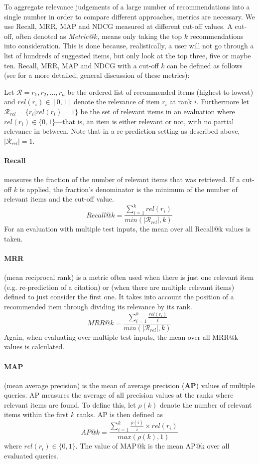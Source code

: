 To aggregate relevance judgements of a large number of recommendations into a single number in order to compare different approaches, metrics are necessary. We use Recall, MRR, MAP and NDCG measured at different cut-off values. A cut-off, often denoted as \emph{Metric@}$k$, means only taking the top $k$ recommendations into consideration. This is done because, realistically, a user will not go through a list of hundreds of suggested items, but only look at the top three, five or maybe ten. Recall, MRR, MAP and NDCG with a cut-off $k$ can be defined as follows (see \cite{Aggarwal2016} for a more detailed, general discussion of these metrics):

Let $\mathcal{R} = r_1,r_2, ..., r_n$ be the ordered list of recommended items (highest to lowest) and ${\mathit{rel}(r_i)\in[0, 1]}$ denote the relevance of item $r_i$ at rank $i$. Furthermore let ${\mathcal{R}_{rel}=\{r_i|\mathit{rel}(r_i)=1\}}$ be the set of relevant items in an evaluation where $\mathit{rel}(r_i)\in\{0,1\}$---that is, an item is either relevant or not, with no partial relevance in between. Note that in a re-prediction setting as described above, $|\mathcal{R}_{rel}|=1$.

\paragraph{Recall} measures the fraction of the number of relevant items that was retrieved. If a cut-off $k$ is applied, the fraction's denominator is the minimum of the number of relevant items and the cut-off value.\[ \mathit{Recall}@k = \frac{\sum\limits_{i=1}^{k} \mathit{rel}(r_i)}{\mathit{min}(|\mathcal{R}_{rel}|,k)} \] For an evaluation with multiple test inputs, the mean over all Recall@k values is taken.

\paragraph{MRR} (mean reciprocal rank) is a metric often used when there is just one relevant item (e.g. re-prediction of a citation) or (when there are multiple relevant items) defined to just consider the first one. It takes into account the position of a recommended item through dividing its relevance by its rank.\[ \mathit{MRR}@k = \frac{\sum\limits_{i=1}^{k} \frac{\mathit{rel}(r_i)}{i}}{\mathit{min}(|\mathcal{R}_{rel}|,k)} \] Again, when evaluating over multiple test inputs, the mean over all MRR@k values is calculated.

\paragraph{MAP} (mean average precision) is the mean of average precision (\textbf{AP}) values of multiple queries. AP measures the average of all precision values at the ranks where relevant items are found. To define this, let $\rho(k)$ denote the number of relevant items within the first $k$ ranks. AP is then defined as \[ \mathit{AP}@k = \frac{\sum\limits_{i=1}^{k} \frac{\rho(i)}{i}\times\mathit{rel}(r_i)}{\mathit{max}(\rho(k), 1)} \] where $\mathit{rel}(r_i)\in\{0,1\}$. The value of MAP@k is the mean AP@k over all evaluated queries.

